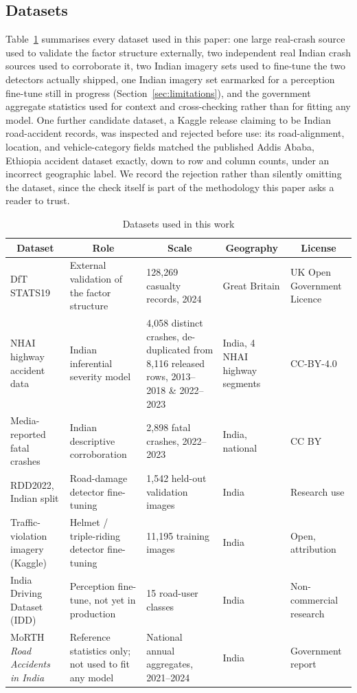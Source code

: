 \documentclass[journal]{IEEEtran}
\begin{document}
\subsection{Datasets}
\label{sec:datasets}

Table~\ref{tab:datasets} summarises every dataset used in this paper: one large real-crash source used to validate the factor structure externally, two independent real Indian crash sources used to corroborate it, two Indian imagery sets used to fine-tune the two detectors actually shipped, one Indian imagery set earmarked for a perception fine-tune still in progress (Section~\ref{sec:limitations}), and the government aggregate statistics used for context and cross-checking rather than for fitting any model. One further candidate dataset, a Kaggle release claiming to be Indian road-accident records, was inspected and rejected before use: its road-alignment, location, and vehicle-category fields matched the published Addis Ababa, Ethiopia accident dataset exactly, down to row and column counts, under an incorrect geographic label. We record the rejection rather than silently omitting the dataset, since the check itself is part of the methodology this paper asks a reader to trust.

\begin{table}[!t]
\centering
\caption{Datasets used in this work}
\label{tab:datasets}
\footnotesize
\setlength{\tabcolsep}{4pt}
\begin{tabular}{p{3.3cm}p{3.1cm}p{3.6cm}p{2.6cm}p{2.3cm}}
\toprule
\multicolumn{1}{c}{\textbf{Dataset}} & \multicolumn{1}{c}{\textbf{Role}} & \multicolumn{1}{c}{\textbf{Scale}} & \multicolumn{1}{c}{\textbf{Geography}} & \multicolumn{1}{c}{\textbf{License}} \\
\midrule
DfT STATS19 \cite{dft2024} & External validation of the factor structure & 128,269 casualty records, 2024 & Great Britain & UK Open Government Licence \\
NHAI highway accident data \cite{khanum2025} & Indian inferential severity model & 4,058 distinct crashes, de-duplicated from 8,116 released rows, 2013--2018 \& 2022--2023 & India, 4 NHAI highway segments & CC-BY-4.0 \\
Media-reported fatal crashes \cite{sharma2025} & Indian descriptive corroboration & 2,898 fatal crashes, 2022--2023 & India, national & CC BY \\
RDD2022, Indian split \cite{arya2024} & Road-damage detector fine-tuning & 1,542 held-out validation images & India & Research use \\
Traffic-violation imagery (Kaggle) & Helmet / triple-riding detector fine-tuning & 11,195 training images & India & Open, attribution \\
India Driving Dataset (IDD) & Perception fine-tune, not yet in production & 15 road-user classes & India & Non-commercial research \\
MoRTH \emph{Road Accidents in India} \cite{morth} & Reference statistics only; not used to fit any model & National annual aggregates, 2021--2024 & India & Government report \\
\bottomrule
\end{tabular}
\end{table}
\end{document}
